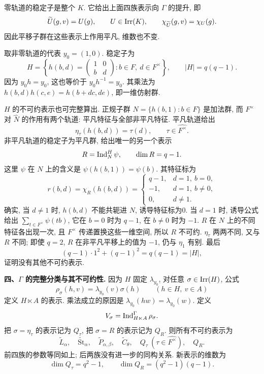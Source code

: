 \begin{solution}
零轨道的稳定子是整个 $K$. 它给出上面四族表示向 $\Gamma$ 的提升, 即
\[
 \widetilde U(g,v)=U(g),\qquad U\in\operatorname{Irr}(K),\qquad
 \chi_{\widetilde U}(g,v)=\chi_U(g).
\]
因此平移子群在这些表示上作用平凡, 维数也不变.

取非零轨道的代表 $y_0=(1,0)$. 稳定子为
\[
 H=\left\{h(b,d)=\begin{pmatrix}1&0\\b&d\end{pmatrix}:
 b\in F,\ d\in F^\times\right\},\qquad |H|=q(q-1).
\]
因为 $y_0h=y_0$, 这也等价于 $y_0h^{-1}=y_0$. 其乘法为
$h(b,d)h(c,e)=h(b+dc,de)$, 即一维仿射群.

$H$ 的不可约表示也可完整算出. 正规子群
$N=\{h(b,1):b\in F\}$ 是加法群, 而 $F^\times$ 对 $\widehat N$ 的作用有两个轨道: 平凡特征与全部非平凡特征. 平凡轨道给出
\[
 \eta_\tau(h(b,d))=\tau(d),\qquad \tau\in\widehat{F^\times}.
\]
非平凡轨道的稳定子为平凡群, 给出唯一的另一个表示
\[
 R=\operatorname{Ind}_N^H\psi,\qquad \dim R=q-1.
\]
这里 $\psi$ 在 $N$ 上的含义是 $\psi(h(b,1))=\psi(b)$. 其特征标为
\begin{equation}\label{eq:final2-H-character}
 r(b,d)=\chi_R(h(b,d))=
 \begin{cases}
 q-1,& d=1,\ b=0,\\
 -1,& d=1,\ b\ne0,\\
 0,& d\ne1.
 \end{cases}
\end{equation}
确实, 当 $d\ne1$ 时, $h(b,d)$ 不能共轭进 $N$, 诱导特征标为0. 当 $d=1$ 时, 诱导公式给出
$\sum_{t\in F^\times}\psi(tb)$, 它在 $b=0$ 时为 $q-1$, 在 $b\ne0$ 时为 $-1$.
$R$ 在 $N$ 上的不同特征各出现一次, 且 $F^\times$ 传递置换这些一维空间, 所以 $R$ 不可约. $\eta_\tau$ 两两不同, 又与 $R$ 不同; 即使 $q=2$, $R$ 在非平凡平移上的值为 $-1$, 仍与 $\eta_1$ 有别. 最后
\[
 (q-1)\cdot1^2+(q-1)^2=q(q-1)=|H|,
\]
证明没有其他不可约表示.

\textbf{四、$\Gamma$ 的完整分类与其不可约性.}
因为 $H$ 固定 $\lambda_{y_0}$, 对任意 $\sigma\in\operatorname{Irr}(H)$, 公式
\[
 \rho_\sigma(h,v)=\lambda_{y_0}(v)\sigma(h)
 \qquad (h\in H,\ v\in A)
\]
定义 $H\ltimes A$ 的表示. 乘法成立的原因是
$\lambda_{y_0}(hw)=\lambda_{y_0}(w)$. 定义
\[
 V_\sigma=\operatorname{Ind}_{H\ltimes A}^{\Gamma}\rho_\sigma.
\]
把 $\sigma=\eta_\tau$ 的表示记为 $Q_\tau$, 把 $\sigma=R$ 的表示记为 $Q_R$. 则所有不可约表示为
\begin{equation}\label{eq:final2-all-affine}
 \widetilde L_\alpha,\quad
 \widetilde{\mathrm{St}}_\alpha,\quad
 \widetilde P_{\alpha,\beta},\quad
 \widetilde C_\theta,\quad
 Q_\tau\ (\tau\in\widehat{F^\times}),\quad Q_R.
\end{equation}
前四族的参数等同如上; 后两族没有进一步的同构关系. 新表示的维数为
\[
 \dim Q_\tau=q^2-1,\qquad
 \dim Q_R=(q^2-1)(q-1).
\]


\end{solution}
